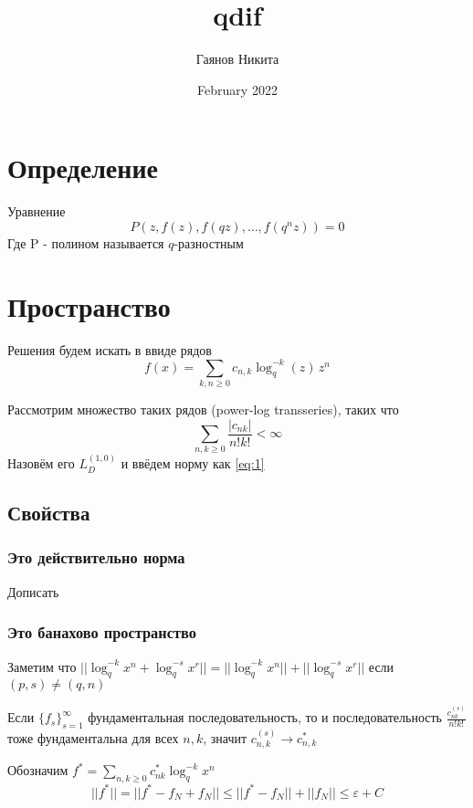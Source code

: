 \documentclass{article}
\title{qdif}
\author{Гаянов Никита}
\date{February 2022}
\begin{document}
	
	\maketitle
	
	\section{Определение}
	Уравнение
	\[P(z,f(z),f(qz),\ldots, f(q^n z)) = 0\]
	Где P - полином называется $q$-разностным
	
	\section{Пространство}
	Решения будем искать в ввиде рядов
	\[f(x) = \sum_{k,n \geq 0} c_{n,k} \log_q^{-k} (z) \, z^n\]
	
	Рассмотрим множество таких рядов (power-log transseries), таких что
	\begin{equation}
		\sum_{n,k\geq 0} \frac{ |c_{nk}|  }{n!k!} < \infty    \label{eq:1}
	\end{equation}
	Назовём его $L_D^{(1,0)}$ и ввёдем норму как \eqref{eq:1}
	
	\subsection{Свойства}
	\subsubsection{Это действительно норма}
	Дописать
	
	\subsubsection{Это банахово пространство}
	
	Заметим что $ ||\log_q^{-k} x^n + \log_q^{-s} x^r|| =||\log_q^{-k} x^n ||+||\log_q^{-s} x^r|| $ если $(p,s) \neq (q,n) $
	
	Если $\{f_s\}_{s=1}^\infty$ фундаментальная последовательность, то и
	последовательность $\displaystyle \frac{c_{nk}^{(s)}}{n!k!}  $ тоже фундаментальна для всех $n,k$, значит $c_{n,k}^{(s)} \to c_{n,k}^*$
	
	Обозначим $f^* = \sum_{n,k\geq0} c_{nk}^* \log_q^{-k}x^n $
	\begin{equation}
		||f^*|| = ||f^* - f_N + f_N|| \leq ||f^* - f_N|| + ||f_N || \leq \varepsilon + C  
	\end{equation}
	
\end{document}
